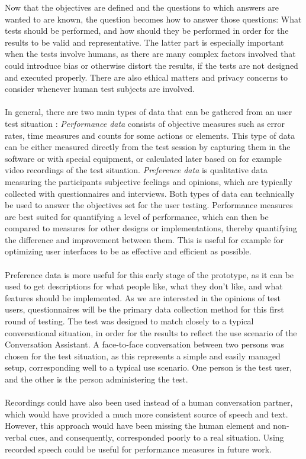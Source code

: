 \documentclass[english, 12pt, a4paper, pdftex, elec, utf8]{aaltothesis}
\begin{document}
Now that the objectives are defined and the questions to which answers are wanted to are known, the question becomes how to answer those questions: What tests should be performed, and how should they be performed in order for the results to be valid and representative. The latter part is especially important when the tests involve humans, as there are many complex factors involved that could introduce bias or otherwise distort the results, if the tests are not designed and executed properly. There are also ethical matters and privacy concerns to consider whenever human test subjects are involved. \cite{rubin2008handbook} \\\\
In general, there are two main types of data that can be gathered from an user test situation \cite[p.~165-166]{rubin2008handbook}: \textit{Performance data} consists of objective measures such as error rates, time measures and counts for some actions or elements. This type of data can be either measured directly from the test session by capturing them in the software or with special equipment, or calculated later based on for example video recordings of the test situation. \textit{Preference data} is qualitative data measuring the participants subjective feelings and opinions, which are typically collected with questionnaires and interviews. Both types of data can technically be used to answer the objectives set for the user testing. Performance measures are best suited for quantifying a level of performance, which can then be compared to measures for other designs or implementations, thereby quantifying the difference and improvement between them. This is useful for example for optimizing user interfaces to be as effective and efficient as possible. \\\\
Preference data is more useful for this early stage of the prototype, as it can be used to get descriptions for what people like, what they don't like, and what features should be implemented. As we are interested in the opinions of test users, questionnaires will be the primary data collection method for this first round of testing. The test was designed to match closely to a typical conversational situation, in order for the results to reflect the use scenario of the Conversation Assistant. A face-to-face conversation between two persons was chosen for the test situation, as this represents a simple and easily managed setup, corresponding well to a typical use scenario. One person is the test user, and the other is the person administering the test. \\\\
Recordings could have also been used instead of a human conversation partner, which would have provided a much more consistent source of speech and text. However, this approach would have been missing the human element and non-verbal cues, and consequently, corresponded poorly to a real situation. Using recorded speech could be useful for performance measures in future work.
\clearpage
\end{document}
